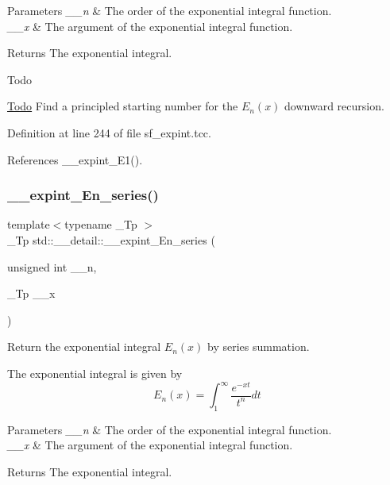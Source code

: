 \begin{DoxyParams}{Parameters}
{\em \+\_\+\+\_\+n} & The order of the exponential integral function. \\
\hline
{\em \+\_\+\+\_\+x} & The argument of the exponential integral function. \\
\hline
\end{DoxyParams}
\begin{DoxyReturn}{Returns}
The exponential integral. 
\end{DoxyReturn}
\begin{DoxyRefDesc}{Todo}
\item[\hyperlink{todo__todo000009}{Todo}]Find a principled starting number for the $ E_n(x) $ downward recursion. \end{DoxyRefDesc}


Definition at line 244 of file sf\+\_\+expint.\+tcc.



References \+\_\+\+\_\+expint\+\_\+\+E1().

\mbox{\label{namespacestd_1_1____detail_a5c51269e411cd82ffec2e63212f76b41}} 
\subsubsection{\texorpdfstring{\+\_\+\+\_\+expint\+\_\+\+En\+\_\+series()}{\_\_expint\_En\_series()}}
{\footnotesize\ttfamily template$<$typename \+\_\+\+Tp $>$ \\
\+\_\+\+Tp std\+::\+\_\+\+\_\+detail\+::\+\_\+\+\_\+expint\+\_\+\+En\+\_\+series (\begin{DoxyParamCaption}\item[{unsigned int}]{\+\_\+\+\_\+n,  }\item[{\+\_\+\+Tp}]{\+\_\+\+\_\+x }\end{DoxyParamCaption})}



Return the exponential integral $ E_n(x) $ by series summation. 

The exponential integral is given by \[ E_n(x) = \int_{1}^\infty \frac{e^{-xt}}{t^n} dt \]


\begin{DoxyParams}{Parameters}
{\em \+\_\+\+\_\+n} & The order of the exponential integral function. \\
\hline
{\em \+\_\+\+\_\+x} & The argument of the exponential integral function. \\
\hline
\end{DoxyParams}
\begin{DoxyReturn}{Returns}
The exponential integral. 
\end{DoxyReturn}


